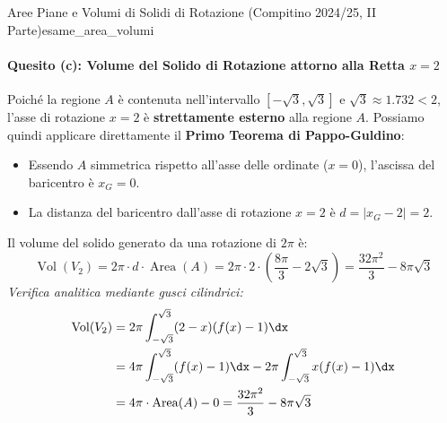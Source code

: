\begin{esempio}{Aree Piane e Volumi di Solidi di Rotazione (Compitino 2024/25, II Parte)}{esame_area_volumi}
\paragraph{Quesito (c): Volume del Solido di Rotazione attorno alla Retta $x = 2$}
Poiché la regione $A$ è contenuta nell'intervallo $[-\sqrt{3}, \sqrt{3}]$ e $\sqrt{3} \approx 1.732 < 2$, l'asse di rotazione $x = 2$ è \textbf{strettamente esterno} alla regione $A$.
Possiamo quindi applicare direttamente il \textbf{Primo Teorema di Pappo-Guldino}:
\begin{itemize}
    \item Essendo $A$ simmetrica rispetto all'asse delle ordinate ($x = 0$), l'ascissa del baricentro è $x_G = 0$.
    \item La distanza del baricentro dall'asse di rotazione $x = 2$ è $d = |x_G - 2| = 2$.
\end{itemize}
Il volume del solido generato da una rotazione di $2\pi$ è:
\[
    \operatorname{Vol}(V_2) = 2\pi \cdot d \cdot \operatorname{Area}(A) = 2\pi \cdot 2 \cdot \left(\frac{8\pi}{3} - 2\sqrt{3}\right) = \frac{32\pi^2}{3} - 8\pi\sqrt{3}
\]
\textit{Verifica analitica mediante gusci cilindrici:}
\begin{align*}
    \operatorname{Vol}(V_2) &= 2\pi \int_{-\sqrt{3}}^{\sqrt{3}} (2 - x)(f(x) - 1)\dx \\
    &= 4\pi \int_{-\sqrt{3}}^{\sqrt{3}} (f(x) - 1)\dx - 2\pi \int_{-\sqrt{3}}^{\sqrt{3}} x(f(x) - 1)\dx \\
    &= 4\pi \cdot \operatorname{Area}(A) - 0 = \frac{32\pi^2}{3} - 8\pi\sqrt{3}
\end{align*}
\end{esempio}

